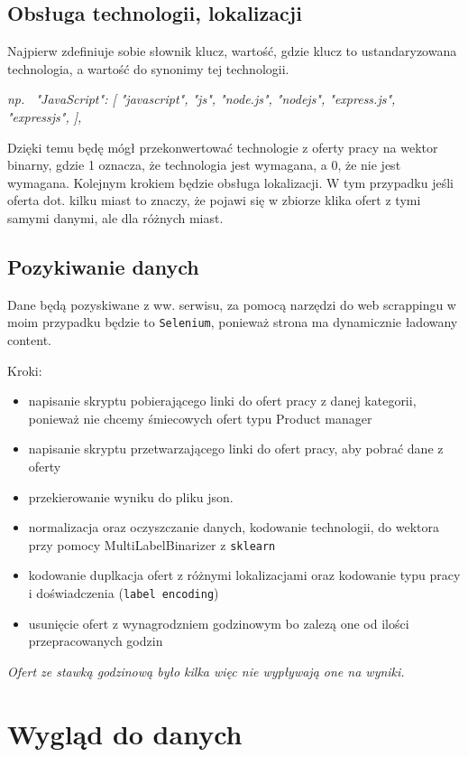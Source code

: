 \documentclass{article}
\begin{document}
\subsection{Obsługa technologii, lokalizacji}

\quad Najpierw zdefiniuje sobie słownik klucz, wartość, gdzie klucz to ustandaryzowana technologia, a wartość do synonimy tej technologii.

\textit{np. \ "JavaScript": [
"javascript",
"js",
"node.js",
"nodejs",
"express.js",
"expressjs",
],}

\quad Dzięki temu będę mógł przekonwertować technologie z oferty pracy na wektor binarny, gdzie 1 oznacza, że technologia jest wymagana, a 0, że nie jest wymagana. Kolejnym
krokiem będzie obsługa lokalizacji. W tym przypadku jeśli oferta dot. kilku miast to znaczy, że pojawi się w zbiorze
klika ofert z tymi samymi danymi, ale dla różnych miast.


\subsection{Pozykiwanie danych}

\quad Dane będą pozyskiwane z ww. serwisu, za pomocą narzędzi do web scrappingu w moim przypadku będzie
to \texttt{Selenium}, ponieważ strona ma dynamicznie ładowany content.


Kroki:
\begin{itemize}
    \item napisanie skryptu pobierającego linki do ofert pracy z danej kategorii, ponieważ nie chcemy śmiecowych ofert typu Product manager
    \item napisanie skryptu przetwarzającego linki do ofert pracy, aby pobrać dane z oferty
    \item przekierowanie wyniku do pliku json.
    \item normalizacja oraz oczyszczanie danych, kodowanie technologii, do wektora przy pomocy MultiLabelBinarizer z \texttt{sklearn}
    \item kodowanie duplkacja ofert z różnymi lokalizacjami oraz kodowanie typu pracy i doświadczenia (\texttt{label encoding})
    \item usunięcie ofert z wynagrodzniem godzinowym bo zalezą one od ilości przepracowanych godzin
\end{itemize}

\textit{Ofert ze stawką godzinową było kilka więc nie wypływają one na wyniki.}

\section{Wygląd do danych}
\end{document}
